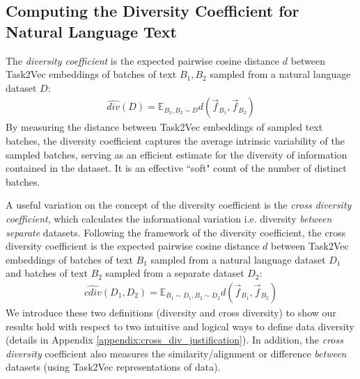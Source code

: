 \subsection{Computing the Diversity Coefficient for Natural Language Text}
\label{body:div_coeff_natural_lang}
The \textit{diversity coefficient} is the expected pairwise cosine distance $d$ between Task2Vec embeddings of batches of text $B_1, B_2$ sampled from a natural language dataset $D$:
\begin{equation*}
\begin{aligned}
    \hat{div}(D) =
    \mathbb{E}_{B_1, B_2 \sim D} 
     d( \vec{f}_{B_1}, \vec{f}_{B_2} )
\end{aligned}
\end{equation*}
By measuring the distance between Task2Vec embeddings of sampled text batches, the diversity coefficient captures the average intrinsic variability of the sampled batches, serving as an efficient estimate for the diversity of information contained in the dataset. 
It is an effective ``soft" count of the number of distinct batches. 

A useful variation on the concept of the diversity coefficient is the \textit{cross diversity coefficient}, which calculates the informational variation i.e. diversity \textit{between} \textit{separate} datasets. 
Following the framework of the diversity coefficient, the cross diversity coefficient is the expected pairwise cosine distance $d$ between Task2Vec embeddings of batches of text $B_1$ sampled from a natural language dataset $D_1$ and batches of text $B_2$ sampled from a separate dataset $D_2$:
\begin{equation*}
\begin{aligned}
    \hat{cdiv}(D_1, D_2) =
    \mathbb{E}_{B_1 \sim D_1, B_2 \sim D_2} 
     d( \vec{f}_{B_1}, \vec{f}_{B_2} )
\end{aligned}
\end{equation*}
We introduce these two definitions (diversity and cross diversity) to show our results hold with respect to two intuitive and logical ways to define data diversity (details in Appendix \ref{appendix:cross_div_justification}).
In addition, the \textit{cross diversity} coefficient also measures the similarity/alignment or difference \textit{between} datasets (using Task2Vec representations of data).

